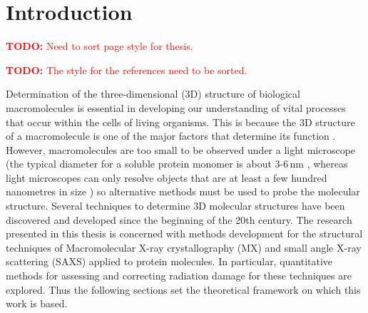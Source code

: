 \chapter{Introduction}
\label{chap:Introduction - Intro chapter}
\textcolor{red}{
\begin{myenumerate}
    \item \hypertarget{todo:SortPageStyle}{\textbf{TODO:} Need to sort page style for thesis.}
    \item \hypertarget{todo:SortReferenceStyle}{\textbf{TODO:} The style for the references need to be sorted.}
\end{myenumerate}
}
Determination of the three-dimensional (3D) structure of biological macromolecules is essential in developing our understanding of vital processes that occur within the cells of living organisms.
This is because the 3D structure of a macromolecule is one of the major factors that determine its function \cite[s~3.6]{berg2002,hegyi1999}.
However, macromolecules are too small to be observed under a light microscope (the typical diameter for a soluble protein monomer is about 3-6$\,$nm \cite{Philips2015}, whereas light microscopes can only resolve objects that are at least a few hundred nanometres in size \cite[p~54]{starr2010}) so alternative methods must be used to probe the molecular structure.
Several techniques to determine 3D molecular structures have been discovered and developed since the beginning of the 20th century.
The research presented in this thesis is concerned with methods development for the structural techniques of Macromolecular X-ray crystallography (MX) and small angle X-ray scattering (SAXS) applied to protein molecules.
In particular, quantitative methods for assessing and correcting radiation damage for these techniques are explored.
Thus the following sections set the theoretical framework on which this work is based.
